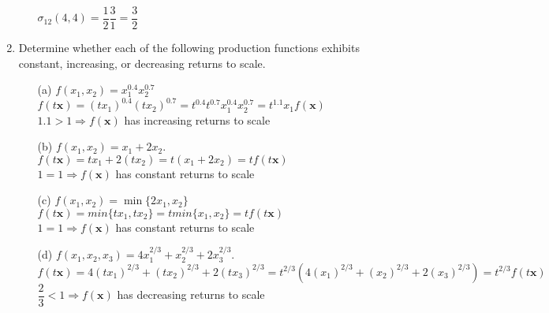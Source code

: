\documentclass[11pt]{article}
\begin{document}
\begin{enumerate}
\begin{itemize}
	$\sigma_{12}(4,4)=\dfrac{1}{2}\dfrac{3}{1}=\dfrac{3}{2}$\\
	\end{itemize}
\item Determine whether each of the following production functions exhibits constant, increasing, or decreasing returns to scale.
    \begin{itemize}
    \item[(a)] $f(x_{1},x_{2})=x_{1}^{0.4}x_{2}^{0.7}$
    \medskip\\
    $f(t\textbf{x})=(tx_1)^{0.4}(tx_2)^{0.7}=t^{0.4}t^{0.7}x_1^{0.4}x_2^{0.7}=t^{1.1}x_1f(\textbf{x})$\\
    $1.1>1\Rightarrow f(\textbf{x})$ has increasing returns to scale\\
    \item[(b)] $f(x_{1},x_{2})=x_{1}+2x_{2}$.
    \medskip\\
    $f(t\textbf{x})=tx_1+2(tx_2)=t(x_1+2x_2)=tf(t\textbf{x})$\\
    $1=1\Rightarrow f(\textbf{x})$ has constant returns to scale\\
    \item[(c)] $f(x_{1},x_{2})=\min\{2x_{1},x_{2}\}$
    \medskip\\
    $f(t\textbf{x})=min\{tx_1,tx_2\}=tmin\{x_1,x_2\}=tf(t\textbf{x})$\\
    $1=1\Rightarrow f(\textbf{x})$ has constant returns to scale\\
    \item[(d)] $f(x_{1},x_{2},x_{3})=4x_{1}^{2/3}+x_{2}^{2/3}+2x_{3}^{2/3}$.
    \medskip\\
    $f(t\textbf{x})=4(tx_1)^{2/3}+(tx_2)^{2/3}+2(tx_3)^{2/3}=t^{2/3}(4(x_1)^{2/3}+(x_2)^{2/3}+2(x_3)^{2/3})=t^{2/3}f(t\textbf{x})$\\
    $\dfrac{2}{3}<1\Rightarrow f(\textbf{x})$ has decreasing returns to scale\\
    \end{itemize}
\end{enumerate}
\end{document}
